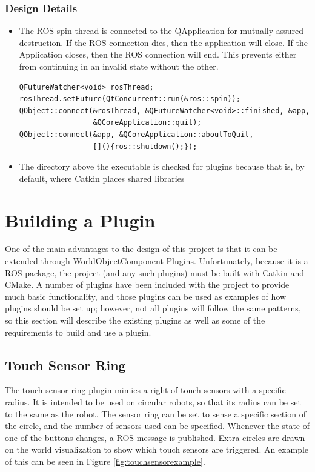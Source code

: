 \begin{itemize}
\subsubsection*{Design Details}
\begin{itemize}
	\item The ROS spin thread is connected to the QApplication for mutually assured destruction. If the ROS connection dies, then the application will close. If the Application closes, then the ROS connection will end. This prevents either from continuing in an invalid state without the other.
	\begin{lstlisting}
QFutureWatcher<void> rosThread;
rosThread.setFuture(QtConcurrent::run(&ros::spin));
QObject::connect(&rosThread, &QFutureWatcher<void>::finished, &app,
                 &QCoreApplication::quit);
QObject::connect(&app, &QCoreApplication::aboutToQuit,
                 [](){ros::shutdown();});
	\end{lstlisting}
	\item The directory above the executable is checked for plugins because that is, by default, where Catkin places shared libraries
\end{itemize}
\section{Building a Plugin}
One of the main advantages to the design of this project is that it can be extended through WorldObjectComponent Plugins. Unfortunately, because it is a ROS package, the project (and any such plugins) must be built with Catkin and CMake. A number of plugins have been included with the project to provide much basic functionality, and those plugins can be used as examples of how plugins should be set up; however, not all plugins will follow the same patterns, so this section will describe the existing plugins as well as some of the requirements to build and use a plugin.
\subsection{Touch Sensor Ring}
The touch sensor ring plugin mimics a right of touch sensors with a specific radius. It is intended to be used on circular robots, so that its radius can be set to the same as the robot. 
	The sensor ring can be set to sense a specific section of the circle, and the number of sensors used can be specified. Whenever the state of one of the buttons changes, a ROS message is published. Extra circles are drawn on the world visualization to show which touch sensors are triggered. An example of this can be seen in Figure \ref{fig:touchsensorexample}.
	

\end{itemize}
